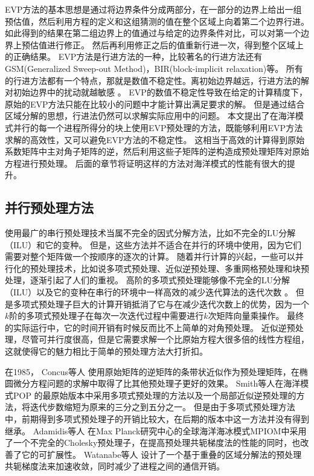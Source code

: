 EVP方法的基本思想是通过将边界条件分成两部分，在一部分的边界上给出一组预估值，然后利用方程的定义和这组猜测的值在整个区域上向着第二个边界行进。
如此得到的结果在第二组边界上的值通过与给定的边界条件对比，可以对第一个边界上预估值进行修正。 然后再利用修正之后的值重新行进一次，得到整个区域上的正确结果\cite{roache1995elliptic}。 
EVP方法是行进方法的一种，比较著名的行进方法还有GSM(Generalized Sweep-out Method)\cite{hirota1970direct}，BIR(block-implicit relaxation)\cite{dietrich1975optimized}等。
所有的行进方法都有一个特点，那就是数值不稳定性。离初始边界越远，行进方法的解对初始边界中的扰动就越敏感 \cite{roache1995elliptic}。
EVP的数值不稳定性导致在给定的计算精度下，原始的EVP方法只能在比较小的问题中才能计算出满足要求的解。 
但是通过结合区域分解的思想，行进法仍然可以求解实际应用中的问题。 
本文提出了在海洋模式并行的每一个进程所得分的块上使用EVP预处理的方法，既能够利用EVP方法求解的高效性，又可以避免EVP方法的不稳定性。 
这相当于高效的计算得到原始系数矩阵中主对角子矩阵的逆，然后利用这些子矩阵的逆构造成预处理矩阵对原始方程进行预处理。 
后面的章节将证明这样的方法对海洋模式的性能有很大的提升。 


\subsection{并行预处理方法}
\label{related:parall}

使用最广的串行预处理技术当属不完全的因式分解方法，比如不完全的LU分解（ILU）和它的变种\cite{benzi2002preconditioning}。 
但是，这些方法并不适合在并行的环境中使用，因为它们需要对整个矩阵做一个按顺序的逐次的计算。 
随着并行计算的兴起，一些可以并行化的预处理技术，比如说多项式预处理、近似逆预处理、多重网格预处理和块预处理，逐渐引起了人们的重视。 
高阶的多项式预处理能够像不完全的LU分解（ILU）以及它的变种在串行的环境中一样高效的减少迭代算法的迭代次数\cite{benzi2002preconditioning} 。 
但是多项式预处理子巨大的计算开销抵消了它与在减少迭代次数上的优势，因为一个$k$阶的多项式预处理子在每次一次迭代过程中需要进行$k$次矩阵向量乘操作。 
最终的实际运行中，它的时间开销有时候反而比不上简单的对角预处理\cite{meyer1989numerical,smith1992parallel}。
近似逆预处理，尽管可并行度很高，但是它需要求解一个比原始方程大很多倍的线性方程组\cite{smith1992parallel,bergamaschi2007numerical}， 这就使得它的魅力相比于简单的预处理方法大打折扣。

在1985， Concus等人 \cite{concus1985block} 使用原始矩阵的逆矩阵的条带状近似作为预处理矩阵，在椭圆微分方程问题的求解中取得了比其他预处理子更好的效果。 
Smith等人\cite{smith1992parallel}在海洋模式POP 的最原始版本中采用多项式预处理的方法以及一个局部近似逆预处理的方法，将迭代步数缩短为原来的三分之到五分之一。
但是由于多项式预处理方法中，前期得到多项式预处理子的开销比较大，在后期的版本中这一方法并没有得到继承。  
Adamidis等人 \cite{adamidis2011high} 在Max Planck研究中心的全球海洋海冰模式MPIOM中采用了一个不完全的Cholesky预处理子，在提高预处理共轭梯度法的性能的同时，也改善了它的可扩展性。 
Watanabe等人\cite{Watanabe2006pcg} 设计了一个基于重叠的区域分解法的预处理共轭梯度法来加速收敛，同时减少了进程之间的通信开销。 
 
